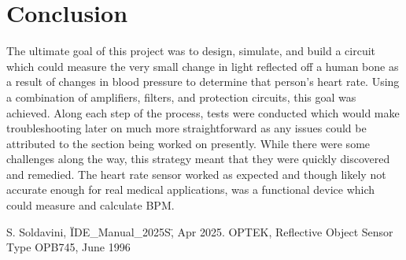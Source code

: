 \documentclass[conference]{IEEEtran}
\begin{document}
\section{Conclusion}
    The ultimate goal of this project was to design, simulate, and build a
    circuit which could measure the very small change in light reflected off a
    human bone as a result of changes in blood pressure to determine that
    person's heart rate. Using a combination of amplifiers, filters, and
    protection circuits, this goal was achieved. Along each step of the
    process, tests were conducted which would make troubleshooting later on
    much more straightforward as any issues could be attributed to the section
    being worked on presently. While there were some challenges along the way,
    this strategy meant that they were quickly discovered and remedied. The
    heart rate sensor worked as expected and though likely not accurate enough
    for real medical applications, was a functional device which could measure
    and calculate BPM.

\begin{thebibliography}{00}
     S. Soldavini, \"IDE\_Manual\_2025S\", Apr 2025.
     OPTEK, Reflective Object Sensor Type OPB745, June 1996
    \end{thebibliography}
\end{document}
